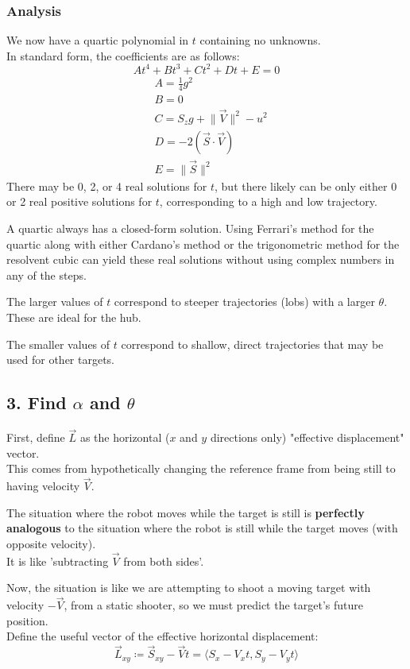 \documentclass{article}
\begin{document}
\subsubsection*{Analysis}
We now have a quartic polynomial in $t$ containing no unknowns. \\
In standard form, the coefficients are as follows:
\[ At^4+Bt^3+Ct^2+Dt+E=0 \]
\begin{align*}
    &A=\frac{1}{4}g^2 \\
    &B=0 \\
    &C=S_zg+\lVert\vec{V}\rVert^2-u^2 \\
    &D=-2(\vec{S}\cdot\vec{V}) \\
    &E=\lVert\vec{S}\rVert^2
\end{align*}
There may be 0, 2, or 4 real solutions for $t$, but there likely can be only either 0 or 2 real positive solutions for $t$, corresponding to a high and low trajectory.

A quartic always has a closed-form solution. Using Ferrari's method for the quartic along with either Cardano's method or the trigonometric method for the resolvent cubic can yield these real solutions without using complex numbers in any of the steps.

The larger values of $t$ correspond to steeper trajectories (lobs) with a larger $\theta$. These are ideal for the hub.

The smaller values of $t$ correspond to shallow, direct trajectories that may be used for other targets.

\subsection*{3. Find $\alpha$ and $\theta$}

First, define $\vec{L}$ as the horizontal ($x$ and $y$ directions only) "effective displacement" vector. \\
This comes from hypothetically changing the reference frame from being still to having velocity $\vec{V}$.

The situation where the robot moves while the target is still is \textbf{perfectly analogous} to the situation where the robot is still while the target moves (with opposite velocity). \\
It is like 'subtracting $\vec{V}$ from both sides'.

Now, the situation is like we are attempting to shoot a moving target with velocity $-\vec{V}$, from a static shooter, so we must predict the target's future position. \\
Define the useful vector of the effective horizontal displacement:
\[ \vec{L}_{xy}\coloneqq\vec{S}_{xy}-\vec{V}t=\langle S_x-V_xt,S_y-V_yt\rangle \]
\end{document}
